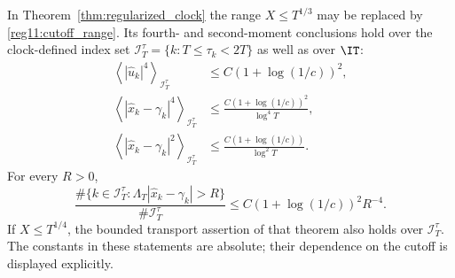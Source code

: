 \begin{theorem}\label{reg11:clock_window}
In Theorem~\ref{thm:regularized_clock} the range $X\le T^{1/3}$ may
be replaced by \eqref{reg11:cutoff_range}. Its fourth- and second-moment
conclusions hold over the clock-defined index set
$\mathcal I_T^\tau=\{k:T\le\tau_k<2T\}$ as well as over $\IT$:
\begin{equation}
\begin{split}
\left\langle|\widehat u_k|^4\right\rangle_{\mathcal I_T^\tau}
&\le C(1+\log(1/c))^2,\\
\left\langle|\widehat x_k-\gamma_k|^4\right\rangle_{\mathcal I_T^\tau}
&\le\frac{C(1+\log(1/c))^2}{\log^4T},\\
\left\langle|\widehat x_k-\gamma_k|^2\right\rangle_{\mathcal I_T^\tau}
&\le\frac{C(1+\log(1/c))}{\log^2T}.
\end{split}
\label{reg11:clock_moments}
\end{equation}
For every $R>0$,
\begin{equation}
\frac{\#\{k\in\mathcal I_T^\tau:
\Lambda_T|\widehat x_k-\gamma_k|>R\}}{\#\mathcal I_T^\tau}
\le C(1+\log(1/c))^2R^{-4}.
\label{reg11:tails}
\end{equation}
If $X\le T^{1/4}$, the bounded transport assertion of that theorem
also holds over $\mathcal I_T^\tau$. The constants in these statements
are absolute; their dependence on the cutoff is displayed explicitly.
\end{theorem}

